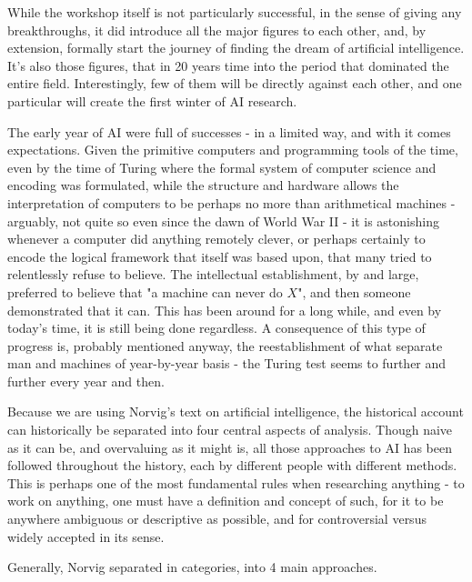 While the workshop itself is not particularly successful, in the sense of giving any breakthroughs, it did introduce all the major figures to each other, and, by extension, formally start the journey of finding the dream of artificial intelligence. It's also those figures, that in 20 years time into the period that dominated the entire field. Interestingly, few of them will be directly against each other, and one particular will create the first winter of AI research. 

The early year of AI were full of successes - in a limited way, and with it comes expectations. Given the primitive computers and programming tools of the time, even by the time of Turing where the formal system of computer science and encoding was formulated, while the structure and hardware allows the interpretation of computers to be perhaps no more than arithmetical machines - arguably, not quite so even since the dawn of World War II - it is astonishing whenever a computer did anything remotely clever, or perhaps certainly to encode the logical framework that itself was based upon, that many tried to relentlessly refuse to believe. The intellectual establishment, by and large, preferred to believe that "a machine can never do $X$", and then someone demonstrated that it can. This has been around for a long while, and even by today's time, it is still being done regardless. A consequence of this type of progress is, probably mentioned anyway, the reestablishment of what separate man and machines of year-by-year basis - the Turing test seems to further and further every year and then.  

Because we are using Norvig's text on artificial intelligence, the historical account can historically be separated into four central aspects of analysis. Though naive as it can be, and overvaluing as it might is, all those approaches to AI has been followed throughout the history, each by different people with different methods. This is perhaps one of the most fundamental rules when researching anything - to work on anything, one must have a definition and concept of such, for it to be anywhere ambiguous or descriptive as possible, and for controversial versus widely accepted in its sense. 

    Generally, Norvig \cite{10.5555/1671238} separated in categories, into 4 main approaches. 

